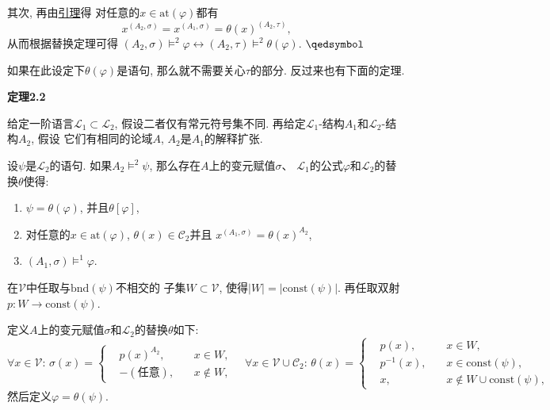 \documentclass[UTF8]{ctexart}
\begin{document}
其次, 再由\href{02 语言的限制与扩张#nameddest=sec:定理1.1}{引理}得
对任意的$x\in\mathrm{at}(\varphi)$都有
\[
    x^{(A_2,\sigma)}=x^{(A_1,\sigma)}=\theta(x)^{(A_2,\tau)},
\]
从而根据替换定理可得
$(A_2,\sigma)\models^2\varphi\leftrightarrow(A_2,\tau)\models^2\theta(\varphi)$.
\hfill $\qedsymbol$


\vspace{10pt}

如果在此设定下$\theta(\varphi)$是语句, 那么就不需要关心$\tau$的部分.
反过来也有下面的定理.

\vspace{10pt}

\hypertarget{sec:定理2.2}{}
\noindent\textbf{定理2.2}

给定一阶语言$\mathcal{L}_1\subset\mathcal{L}_2$, 假设二者仅有常元符号集不同.
再给定$\mathcal{L}_1$-结构$A_1$和$\mathcal{L}_2$-结构$A_2$, 假设
它们有相同的论域$A$, $A_2$是$A_1$的解释扩张.

设$\psi$是$\mathcal{L}_2$的语句. 如果$A_2\models^2\psi$,
那么存在$A$上的变元赋值$\sigma$、
$\mathcal{L}_1$的公式$\varphi$和$\mathcal{L}_2$的替换$\theta$使得:
\begin{enumerate}
    \item $\psi=\theta(\varphi)$, 并且$\theta[\varphi]$,
    \item 对任意的$x\in\mathrm{at}(\varphi)$, $\theta(x)\in\mathcal{C}_2$并且
    $x^{(A_1,\sigma)}=\theta(x)^{A_2}$,
    \item $(A_1,\sigma)\models^1\varphi$.
\end{enumerate}


在$\mathcal{V}$中任取与$\mathrm{bnd}(\psi)$不相交的
子集$W\subset\mathcal{V}$, 使得$|W|=|\mathrm{const}(\psi)|$.
再任取双射$p:W\to\mathrm{const}(\psi)$.

定义$A$上的变元赋值$\sigma$和$\mathcal{L}_2$的替换$\theta$如下:
\[\forall x\in\mathcal{V}:\,\sigma(x)=\left\{\begin{aligned}
    &p(x)^{A_2},\,&&x\in W,\\[-3pt]
    &-(\text{任意}),\,&&x\notin W,
\end{aligned}\right.\quad
\forall x\in\mathcal{V}\cup\mathcal{C}_2:\,\theta(x)=\left\{\begin{aligned}
    &p(x),\,&&x\in W,\\[-3pt]
    &p^{-1}(x),\,&&x\in\mathrm{const}(\psi),\\[-3pt]
    &x,\,&&x\notin W\cup\mathrm{const}(\psi),
\end{aligned}\right.\]
然后定义$\varphi=\theta(\psi)$.
\end{document}
